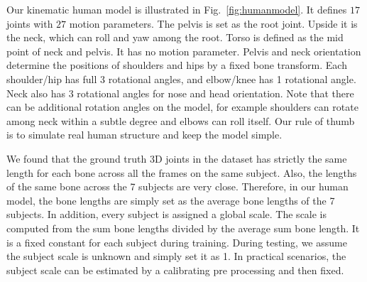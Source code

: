 \documentclass[runningheads]{llncs}
\begin{document}
Our kinematic human model is illustrated in Fig.~\ref{fig:humanmodel}. It defines $17$ joints with $27$ motion parameters. The pelvis is set as the root joint. Upside it is the neck, which can roll and yaw among the root. Torso is defined as the mid point of neck and pelvis. It has no motion parameter. Pelvis and neck orientation determine the positions of shoulders and hips by a fixed bone transform. Each shoulder/hip has full 3 rotational angles, and elbow/knee has 1 rotational angle. Neck also has 3 rotational angles for nose and head orientation. Note that there can be additional rotation angles on the model, for example shoulders can rotate among neck within a subtle degree and elbows can roll itself. Our rule of thumb is to simulate real human structure and keep the model simple.

We found that the ground truth 3D joints in the dataset has strictly the same length for each bone across all the frames on the same subject. Also, the lengths of the same bone across the 7 subjects are very close. Therefore, in our human model, the bone lengths are simply set as the average bone lengths of the 7 subjects. In addition, every subject is assigned a global scale. The scale is computed from the sum bone lengths divided by the average sum bone length. It is a fixed constant for each subject during training. During testing, we assume the subject scale is unknown and simply set it as 1. In practical scenarios, the subject scale can be estimated by a calibrating pre processing and then fixed.
\end{document}
